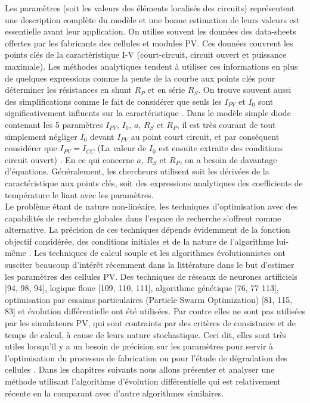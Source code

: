 Les paramètres (soit les valeurs des éléments localisés des circuits) représentent une description complète du modèle et une bonne estimation de leurs valeurs est essentielle avant leur application. On utilise souvent les données des data-sheets offertes par les fabricants des cellules et modules PV. Ces données couvrent les points clés de la caractéristique I-V (court-circuit, circuit ouvert et puissance maximale). Les méthodes analytiques tendent à utiliser ces informations en plus de quelques expressions comme la pente de la courbe aux points clés pour déterminer les résistances en shunt $R_P$ et en série $R_S$. On trouve souvent aussi des simplifications comme le fait de considérer que seuls les $I_{PV}$ et $I_0$ sont significativement influents sur la caractéristique \cite{Ciulla2014}.
Dans le modèle simple diode contenant les 5 paramètres $I_{PV}$, $I_0$, $a$, $R_S$ et $R_P$, il est très courant de tout simplement négliger $I_0$ devant $I_{PV}$ au point court circuit, et par conséquent considérer que $I_{PV} = I_{CC}$ (La valeur de $I_0$ est ensuite extraite des conditions circuit ouvert) \cite{Villalva2009,Ciulla2014,Tsai2008}. En ce qui concerne $a$, $R_S$ et $R_P$, on a besoin de davantage d'équations. Généralement, les chercheurs utilisent soit les dérivées de la caractéristique aux points clés, soit des expressions analytiques des coefficients de température le liant avec les paramètres.\\
Le problème étant de nature non-linéaire, les techniques d'optimisation avec des capabilités de recherche globales dans l'espace de recherche s'offrent comme alternative. La précision de ces techniques dépends évidemment de la fonction objectif considérée, des conditions initiales et de la nature de l'algorithme lui-même \cite{Easwarakhanthan1986b, El-Naggar2012, DaCosta2010}. Les techniques de calcul souple et les algorithmes évolutionnistes ont susciter beaucoup d'intérêt récemment dans la littérature dans le but d'estimer les paramètres des cellules PV. Des techniques de réseaux de neurones artificiels [94, 98, 94], logique floue [109, 110, 111], algorithme génétique [76, 77 113], optimisation par essaims particulaires (Particle Swarm Optimization) [81, 115, 83] et évolution différentielle \cite{DaCosta2010, Ishaque2012, Gong2013} ont été utilisées. Par contre elles ne sont pas utilisées par les simulateurs PV, qui sont contraints par des critères de consistance et de temps de calcul, à cause de leurs nature stochastique. Ceci dit, elles sont très utiles lorsqu'il y a un besoin de précision sur les paramètres pour servir à l'optimisation du processus de fabrication ou pour l'étude de dégradation des cellules \cite{Ikegami2001,Balzani2005}. Dans les chapitres suivants nous allons présenter et analyser une méthode utilisant l'algorithme d'évolution différentielle qui est relativement récente en la comparant avec d'autre algorithmes similaires.
